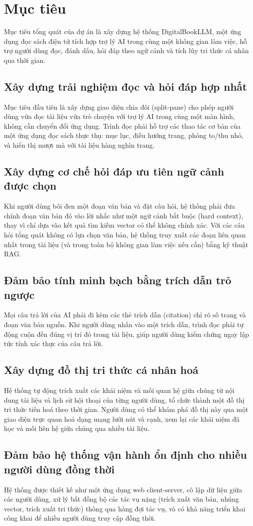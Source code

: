 \section{Mục tiêu}
Mục tiêu tổng quát của dự án là xây dựng hệ thống DigitalBookLLM, một ứng dụng đọc sách điện tử tích hợp trợ lý AI trong cùng một không gian làm việc, hỗ trợ người dùng đọc, đánh dấu, hỏi đáp theo ngữ cảnh và tích lũy tri thức cá nhân qua thời gian.
\subsection{Xây dựng trải nghiệm đọc và hỏi đáp hợp nhất}
Mục tiêu đầu tiên là xây dựng giao diện chia đôi (split-pane) cho phép người dùng vừa đọc tài liệu vừa trò chuyện với trợ lý AI trong cùng một màn hình, không cần chuyển đổi ứng dụng. Trình đọc phải hỗ trợ các thao tác cơ bản của một ứng dụng đọc sách thực thụ: mục lục, điều hướng trang, phóng to/thu nhỏ, và hiển thị mượt mà với tài liệu hàng nghìn trang.
\subsection{Xây dựng cơ chế hỏi đáp ưu tiên ngữ cảnh được chọn}
Khi người dùng bôi đen một đoạn văn bản và đặt câu hỏi, hệ thống phải đưa chính đoạn văn bản đó vào lời nhắc như một ngữ cảnh bắt buộc (hard context), thay vì chỉ dựa vào kết quả tìm kiếm vector có thể không chính xác. Với các câu hỏi tổng quát không có lựa chọn văn bản, hệ thống truy xuất các đoạn liên quan nhất trong tài liệu (và trong toàn bộ không gian làm việc nếu cần) bằng kỹ thuật RAG.
\subsection{Đảm bảo tính minh bạch bằng trích dẫn trỏ ngược}
Mọi câu trả lời của AI phải đi kèm các thẻ trích dẫn (citation) chỉ rõ số trang và đoạn văn bản nguồn. Khi người dùng nhấn vào một trích dẫn, trình đọc phải tự động cuộn đến đúng vị trí đó trong tài liệu, giúp người dùng kiểm chứng ngay lập tức tính xác thực của câu trả lời.
\subsection{Xây dựng đồ thị tri thức cá nhân hoá}
Hệ thống tự động trích xuất các khái niệm và mối quan hệ giữa chúng từ nội dung tài liệu và lịch sử hội thoại của từng người dùng, tổ chức thành một đồ thị tri thức tiến hoá theo thời gian. Người dùng có thể khám phá đồ thị này qua một giao diện trực quan hoá dạng mạng lưới nút và cạnh, xem lại các khái niệm đã học và mối liên hệ giữa chúng qua nhiều tài liệu.
\subsection{Đảm bảo hệ thống vận hành ổn định cho nhiều người dùng đồng thời}
Hệ thống được thiết kế như một ứng dụng web client-server, cô lập dữ liệu giữa các người dùng, xử lý bất đồng bộ các tác vụ nặng (trích xuất văn bản, nhúng vector, trích xuất tri thức) thông qua hàng đợi tác vụ, và có khả năng triển khai công khai để nhiều người dùng truy cập đồng thời.
